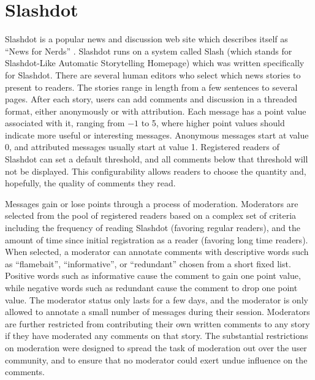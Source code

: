 
\section{Slashdot}
Slashdot is a popular news and discussion web site which describes itself as
``News for Nerds'' \cite{slashdot-website}. Slashdot runs on a system called
Slash (which stands for Slashdot-Like Automatic Storytelling Homepage) which
was written specifically for Slashdot. There are several human editors who
select which news stories to present to readers. The stories range in length
from a few sentences to several pages. After each story, users can add comments
and discussion in a threaded format, either anonymously or with attribution.
Each message has a point value associated with it, ranging from $-1$ to 5,
where higher point values should indicate more useful or interesting messages.
Anonymous messages start at value 0, and attributed messages usually start at
value 1. Registered readers of Slashdot can set a default threshold, and all
comments below that threshold will not be displayed. This configurability
allows readers to choose the quantity and, hopefully, the quality of comments
they read.

Messages gain or lose points through a process of moderation. Moderators are
selected from the pool of registered readers based on a complex set of criteria
including the frequency of reading Slashdot (favoring regular readers), and the
amount of time since initial registration as a reader (favoring long time
readers). When selected, a moderator can annotate comments with descriptive
words such as ``flamebait'', ``informative'', or ``redundant'' chosen from a
short fixed list. Positive words such as informative cause the comment to gain
one point value, while negative words such as redundant cause the comment to
drop one point value. The moderator status only lasts for a few days, and the
moderator is only allowed to annotate a small number of messages during their
session. Moderators are further restricted from contributing their own written
comments to any story if they have moderated any comments on that story. The
substantial restrictions on moderation were designed to spread the task of
moderation out over the user community, and to ensure that no moderator could
exert undue influence on the comments.

